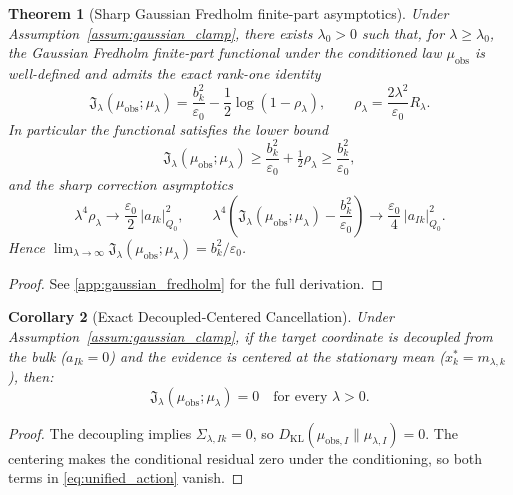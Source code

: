 \documentclass[preprint,12pt]{elsarticle}
\theoremstyle{plain}
\newtheorem{theorem}{Theorem}
\newtheorem{corollary}[theorem]{Corollary}
\theoremstyle{definition}
\theoremstyle{remark}
\newcommand{\KL}{D_{\operatorname{KL}}}
\begin{document}
    \begin{theorem}[Sharp Gaussian Fredholm finite-part asymptotics]
        \label{thm:finite_part_regularization}
        Under Assumption~\ref{assum:gaussian_clamp}, there exists $\lambda_0>0$
        such that, for $\lambda\ge\lambda_0$, the Gaussian Fredholm finite-part
        functional under the conditioned law $\mu_{\mathrm{obs}}$ is well-defined
        and admits the exact rank-one identity
        \begin{equation}
            \label{eq:unified_regularization}
            \mathfrak{J}_\lambda(\mu_{\mathrm{obs}}; \mu_\lambda)
            = \frac{b_k^2}{\varepsilon_0}
              -\frac12\log(1-\rho_\lambda),
            \qquad
            \rho_\lambda=\frac{2\lambda^2}{\varepsilon_0}R_\lambda .
        \end{equation}
        In particular the functional satisfies the lower bound
        \begin{equation}
            \label{eq:finite_part_lower_bound}
            \mathfrak{J}_\lambda(\mu_{\mathrm{obs}}; \mu_\lambda)
            \ge \frac{b_k^2}{\varepsilon_0}+\tfrac12\rho_\lambda
            \ge \frac{b_k^2}{\varepsilon_0},
        \end{equation}
        and the sharp correction asymptotics
        \begin{equation}
            \label{eq:finite_part_sharp}
            \lambda^4\rho_\lambda\longrightarrow\frac{\varepsilon_0}{2}\,|a_{Ik}|_{Q_0}^2,
            \qquad
            \lambda^4\!\left(
                \mathfrak{J}_\lambda(\mu_{\mathrm{obs}}; \mu_\lambda)
                -\frac{b_k^2}{\varepsilon_0}
            \right)
            \longrightarrow
            \frac{\varepsilon_0}{4}\,|a_{Ik}|_{Q_0}^2 .
        \end{equation}
        Hence $\lim_{\lambda\to\infty}\mathfrak{J}_\lambda(\mu_{\mathrm{obs}}; \mu_\lambda)=b_k^2/\varepsilon_0$.
    \end{theorem}
    \begin{proof}
        See \ref{app:gaussian_fredholm} for the full derivation.
    \end{proof}

    \begin{corollary}[Exact Decoupled-Centered Cancellation]
        \label{cor:exact_pole_zero}
        Under Assumption~\ref{assum:gaussian_clamp}, if the target coordinate is decoupled from the bulk ($a_{Ik} = 0$) and the evidence is centered at the stationary mean ($x_k^* = m_{\lambda,k}$), then:
        \begin{equation}
            \mathfrak{J}_\lambda(\mu_{\mathrm{obs}}; \mu_\lambda) = 0 \quad \text{for every } \lambda > 0.
        \end{equation}
    \end{corollary}
    \begin{proof}
        The decoupling implies $\Sigma_{\lambda,Ik} = 0$, so $\KL(\mu_{\text{obs},I} \parallel \mu_{\lambda,I}) = 0$. The centering makes the conditional residual zero under the conditioning, so both terms in \eqref{eq:unified_action} vanish.
    \end{proof}
\end{document}
